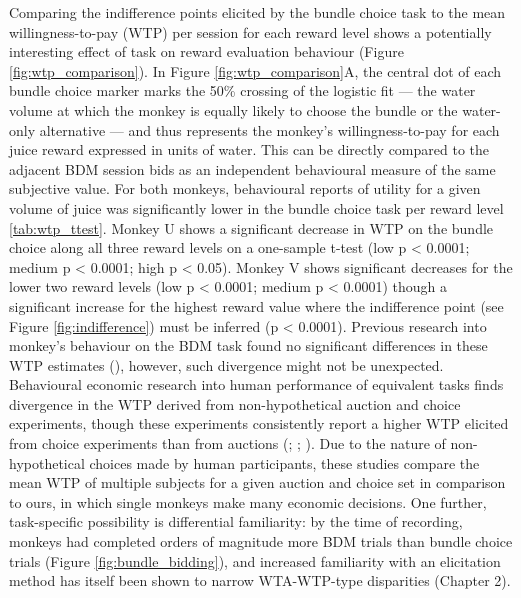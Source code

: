 Comparing the indifference points elicited by the bundle choice task to the mean willingness-to-pay (WTP) per session for each reward level shows a potentially interesting effect of task on reward evaluation behaviour (Figure \ref{fig:wtp_comparison}). In Figure \ref{fig:wtp_comparison}A, the central dot of each bundle choice marker marks the 50\% crossing of the logistic fit — the water volume at which the monkey is equally likely to choose the bundle or the water-only alternative — and thus represents the monkey's willingness-to-pay for each juice reward expressed in units of water. This can be directly compared to the adjacent BDM session bids as an independent behavioural measure of the same subjective value. For both monkeys, behavioural reports of utility for a given volume of juice was significantly lower in the bundle choice task per reward level \ref{tab:wtp_ttest}. Monkey U shows a significant decrease in WTP on the bundle choice along all three reward levels on a one-sample t-test (low p < 0.0001; medium p < 0.0001; high p < 0.05). Monkey V shows significant decreases for the lower two reward levels (low p < 0.0001; medium p < 0.0001) though a significant increase for the highest reward value where the indifference point (see Figure \ref{fig:indifference}) must be inferred (p < 0.0001). Previous research into monkey’s behaviour on the BDM task found no significant differences in these WTP estimates (\cite{almohammadRewardValueRevealed2022}), however, such divergence might not be unexpected. Behavioural economic research into human performance of equivalent tasks finds divergence in the WTP derived from non-hypothetical auction and choice experiments, though these experiments consistently report a higher WTP elicited from choice experiments than from auctions (\cite{banerjiUsingElicitationMechanisms2015}; \cite{hamukwalaDesignFactorsInfluencing2019}; \cite{luskAuctionBidsShopping2006}). Due to the nature of non-hypothetical choices made by human participants, these studies compare the mean WTP of multiple subjects for a given auction and choice set in comparison to ours, in which single monkeys make many economic decisions. One further, task-specific possibility is differential familiarity: by the time of recording, monkeys had completed orders of magnitude more BDM trials than bundle choice trials (Figure \ref{fig:bundle_bidding}), and increased familiarity with an elicitation method has itself been shown to narrow WTA-WTP-type disparities (Chapter 2).

